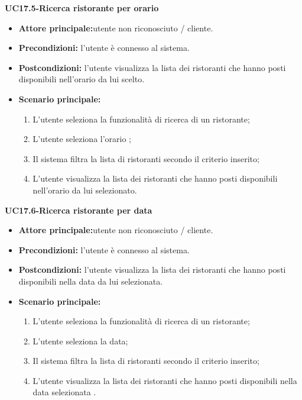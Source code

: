 \textbf{UC17.5-Ricerca ristorante per orario}
\begin{itemize}
\item \textbf{Attore principale:}utente non riconosciuto / cliente.
\item \textbf{Precondizioni:} l'utente è connesso al sistema.
\item \textbf{Postcondizioni:} l'utente visualizza la lista dei ristoranti che hanno posti disponibili nell'orario 
da lui scelto.
\item \textbf{Scenario principale:}
\begin{enumerate}
    \item L'utente seleziona la funzionalità di ricerca di un ristorante;
    \item L'utente seleziona l'orario ;
    \item Il sistema filtra la lista di ristoranti secondo il criterio inserito;
    \item L'utente visualizza la lista dei ristoranti che hanno posti disponibili nell'orario da lui
    selezionato.
\end{enumerate}
\end{itemize}

\textbf{UC17.6-Ricerca ristorante per data}
\begin{itemize}
\item \textbf{Attore principale:}utente non riconosciuto / cliente.
\item \textbf{Precondizioni:} l'utente è connesso al sistema.
\item \textbf{Postcondizioni:} l'utente visualizza la lista dei ristoranti che hanno posti disponibili
nella data da lui selezionata.
\item \textbf{Scenario principale:}
\begin{enumerate}
    \item L'utente seleziona la funzionalità di ricerca di un ristorante;
    \item L'utente seleziona la data;
    \item Il sistema filtra la lista di ristoranti secondo il criterio inserito;
    \item L'utente visualizza la lista dei ristoranti che hanno posti disponibili
    nella data selezionata .
\end{enumerate}
\end{itemize}

